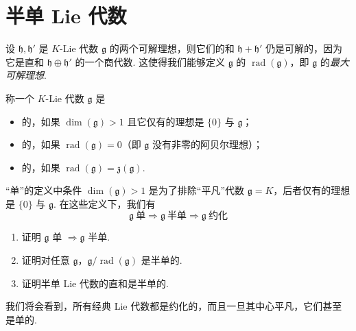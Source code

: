 \section{半单 Lie 代数}\label{sec:lie-2-4}

设 $\mathfrak h,\mathfrak h'$ 是 $K$-Lie 代数 $\mathfrak g$ 的两个可解理想，则它们的和 $\mathfrak h+\mathfrak h'$ 仍是可解的，因为它是直和 $\mathfrak h\oplus\mathfrak h'$ 的一个商代数. 这使得我们能够定义 $\mathfrak g$ 的 $\operatorname{rad}(\mathfrak g)$，即 $\mathfrak g$ 的\emph{最大可解理想}.
\begin{definition}\label{def:lie-2-4-1}
称一个 $K$-Lie 代数 $\mathfrak g$ 是
\begin{itemize}[label=--]
\item {}的，如果 $\dim(\mathfrak g)>1$ 且它仅有的理想是 $\{0\}$ 与 $\mathfrak g$；
\item {}的，如果 $\operatorname{rad}(\mathfrak g)=0$（即 $\mathfrak g$ 没有非零的阿贝尔理想）；
\item {}的，如果 $\operatorname{rad}(\mathfrak g)=\mathfrak z(\mathfrak g)$.
\end{itemize}
\end{definition}
\begin{remark*}
``单''的定义中条件 $\dim(\mathfrak g)>1$ 是为了排除``平凡''代数 $\mathfrak g=K$，后者仅有的理想是 $\{0\}$ 与 $\mathfrak g$. 在这些定义下，我们有
\[
\mathfrak g\ \text{单}\Rightarrow\mathfrak g\ \text{半单}\Rightarrow\mathfrak g\ \text{约化}
\]
\end{remark*}
\begin{exercise*}
\begin{enumerate}[label=\roman*)]
\item 证明 $\mathfrak g$ 单 $\Rightarrow\mathfrak g$ 半单.
\item 证明对任意 $\mathfrak g$，$\mathfrak g/\operatorname{rad}(\mathfrak g)$ 是半单的.
\item 证明半单 Lie 代数的直和是半单的.
\end{enumerate}
\end{exercise*}
我们将会看到，所有经典 Lie 代数都是约化的，而且一旦其中心平凡，它们甚至是单的.
